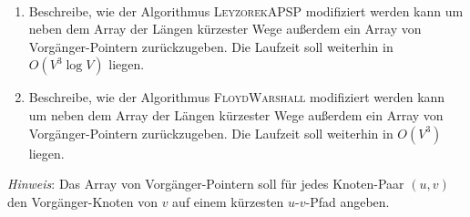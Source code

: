 \documentclass{uebung_cs}
\begin{document}
\begin{aufgabe}
\ 
  \begin{enumerate}
    \item Beschreibe, wie der Algorithmus \textsc{LeyzorekAPSP} modifiziert werden kann um neben dem Array der Längen kürzester Wege außerdem ein Array von Vorgänger-Pointern zurückzugeben.
    Die Laufzeit soll weiterhin in $O(V^3 \log V)$ liegen.
    \item Beschreibe, wie der Algorithmus \textsc{FloydWarshall} modifiziert werden kann um neben dem Array der Längen kürzester Wege außerdem ein Array von Vorgänger-Pointern zurückzugeben.
    Die Laufzeit soll weiterhin in $O(V^3)$ liegen.
  \end{enumerate}
  \emph{Hinweis}: Das Array von Vorgänger-Pointern soll für jedes Knoten-Paar $(u,v)$ den Vorgänger-Knoten von $v$ auf einem kürzesten $u$-$v$-Pfad angeben.
\end{aufgabe}

\end{document}
